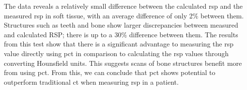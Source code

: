 \documentclass[main.tex]{subfiles}
\begin{document}
The data reveals a relatively small difference between the calculated \gls{rsp} and the measured \gls{rsp} in soft tissue, with an average difference of only 2\% between them. Structures such as teeth and bone show larger discrepancies between measured and calculated RSP; there is up to a 30\% difference between them. The results from this test show that there is a significant advantage to measuring the \gls{rsp} value directly using \gls{pct} in comparison to calculating the \gls{rsp} values through converting Hounsfield units. This suggests scans of bone structures benefit more from using \gls{pct}. From this, we can conclude that \gls{pct} shows potential to outperform traditional \gls{ct} when measuring \gls{rsp} in a patient.    
\end{document}
